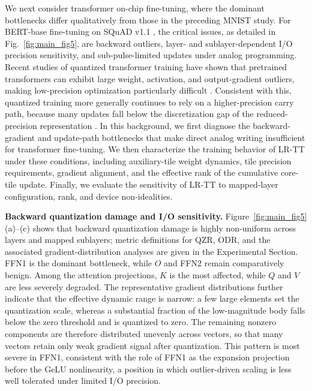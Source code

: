 \documentclass[AMA,LATO2COL]{WileyNJDv5}
\begin{document}
\noindent
We next consider transformer on-chip fine-tuning, where the dominant bottlenecks differ qualitatively from those in the preceding MNIST study. For BERT-base \cite{devlin-etal-2019-bert} fine-tuning on SQuAD v1.1 \cite{rajpurkar-etal-2016-squad}, the critical issues, as detailed in Fig.~\ref{fig:main_fig5}, are backward outliers, layer- and sublayer-dependent I/O precision sensitivity, and sub-pulse-limited updates under analog programming. Recent studies of quantized transformer training have shown that pretrained transformers can exhibit large weight, activation, and output-gradient outliers, making low-precision optimization particularly difficult \cite{ashkboos2025halo,bondarenko-etal-2021-understanding,xi2023training}. Consistent with this, quantized training more generally continues to rely on a higher-precision carry path, because many updates fall below the discretization gap of the reduced-precision representation \cite{nikdan2026eco}. In this background, we first diagnose the backward-gradient and update-path bottlenecks that make direct analog writing insufficient for transformer fine-tuning. We then characterize the training behavior of LR-TT under these conditions, including auxiliary-tile weight dynamics, tile precision requirements, gradient alignment, and the effective rank of the cumulative core-tile update. Finally, we evaluate the sensitivity of LR-TT to mapped-layer configuration, rank, and device non-idealities.

\noindent\textbf{Backward quantization damage and I/O sensitivity.}
Figure~\ref{fig:main_fig5}(a)--(c) shows that backward quantization damage is highly non-uniform across layers and mapped sublayers; metric definitions for QZR, ODR, and the associated gradient-distribution analyses are given in the Experimental Section. FFN1 is the dominant bottleneck, while \(O\) and FFN2 remain comparatively benign. Among the attention projections, \(K\) is the most affected, while \(Q\) and \(V\) are less severely degraded. The representative gradient distributions further indicate that the effective dynamic range is narrow: a few large elements set the quantization scale, whereas a substantial fraction of the low-magnitude body falls below the zero threshold and is quantized to zero. The remaining nonzero components are therefore distributed unevenly across vectors, so that many vectors retain only weak gradient signal after quantization. This pattern is most severe in FFN1, consistent with the role of FFN1 as the expansion projection before the GeLU nonlinearity, a position in which outlier-driven scaling is less well tolerated under limited I/O precision.
\end{document}

